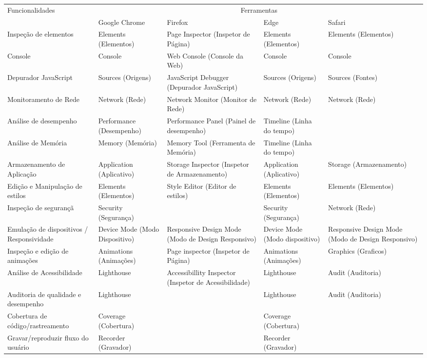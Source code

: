 \begin{table}[htbp!]
\centering
\begin{tabularx}{\textwidth}{|p{4cm}|X|p{3cm}|X|X|}
\hline
\multirow{2}{*}{Funcionalidades} & \multicolumn{4}{c|}{Ferramentas} \\ \cline{2-5}
 & Google Chrome & Firefox & Edge & Safari \\ \hline
Inspeção de elementos   & Elements (Elementos) & Page Inspector (Inspetor de Página) & Elements (Elementos) & Elements (Elementos) \\ \hline
Console                 & Console & Web Console (Console da Web) & Console & Console \\ \hline
Depurador JavaScript    & Sources (Origens)  & JavaScript Debugger (Depurador JavaScript) & Sources (Origens) & Sources (Fontes) \\ \hline
Monitoramento de Rede   & Network (Rede) & Network Monitor (Monitor de Rede) & Network (Rede) & Network (Rede) \\ \hline
Análise de desempenho & Performance (Desempenho) & Performance Panel (Painel de desempenho) & Timeline (Linha do tempo) & \\ \hline
Análise de Memória & Memory (Memória)& Memory Tool (Ferramenta de Memória) & Timeline (Linha do tempo) & \\ \hline
Armazenamento de Aplicação & Application (Aplicativo) & Storage Inspector (Inspetor de Armazenamento) & Application (Aplicativo) & Storage (Armazenamento) \\ \hline
Edição e Manipulação de estilos & Elements (Elementos) & Style Editor (Editor de estilos) & Elements (Elementos) & Elements (Elementos) \\ \hline
Inspeção de segurançã & Security (Segurança) & & Security (Segurança) & Network (Rede) \\ \hline
Emulação de dispositivos / Responsividade & Device Mode (Modo Dispositivo) & Responsive Design Mode (Modo de Design Responsivo) & Device Mode (Modo dispositivo) & Responsive Design Mode (Modo de Design Responsivo) \\ \hline
Inspeção e edição de animações & Animations (Animações) & Page inspector (Inspetor de Página) & Animations (Animações) & Graphics (Graficos) \\ \hline
Análise de Acessibilidade & Lighthouse & Accessibillity Inspector (Inspetor de Acessibilidade) & Lighthouse & Audit (Auditoria) \\ \hline
Auditoria de qualidade e desempenho & Lighthouse &  & Lighthouse & Audit (Auditoria) \\ \hline
Cobertura de código/rastreamento & Coverage (Cobertura) &   & Coverage (Cobertura) &  \\ \hline
Gravar/reproduzir fluxo do usuário & Recorder (Gravador) &  & Recorder (Gravador) &  \\ \hline
\end{tabularx}
\end{table}